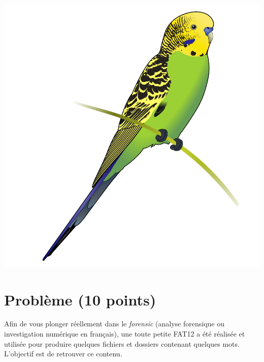 \documentclass[11pt,a4paper]{article}
\begin{document}
\begin{center}
\includegraphics[scale=0.2]{img/others/Budgerigar_diagram.png}
\end{center}

\vfillLast

\clearpage


\section{Problème (10 points)}


Afin de vous plonger réellement dans le \textit{forensic} (analyse forensique ou investigation numérique en français), une toute petite FAT12 a été réalisée et utilisée pour produire quelques fichiers et dossiers contenant quelques mots.
L'objectif est de retrouver ce contenu.
\end{document}
